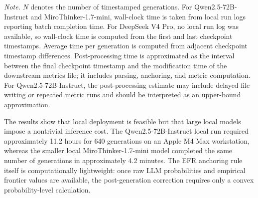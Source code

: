 \documentclass[11pt]{article}
\begin{document}
\begin{table}[htbp]
\centering
\caption{Runtime summary for full-scale unconstrained LLM generation.}
\label{tab:S10}

\vspace{0.3em}
\begin{minipage}{0.95\textwidth}
\small
\textit{Note.} \(N\) denotes the number of timestamped generations. For Qwen2.5-72B-Instruct and MiroThinker-1.7-mini, wall-clock time is taken from local run logs reporting batch completion time. For DeepSeek V4 Pro, no local run log was available, so wall-clock time is computed from the first and last checkpoint timestamps. Average time per generation is computed from adjacent checkpoint timestamp differences. Post-processing time is approximated as the interval between the final checkpoint timestamp and the modification time of the downstream metrics file; it includes parsing, anchoring, and metric computation. For Qwen2.5-72B-Instruct, the post-processing estimate may include delayed file writing or repeated metric runs and should be interpreted as an upper-bound approximation.
\end{minipage}
\end{table}

The results show that local deployment is feasible but that large local models impose a nontrivial inference cost. The Qwen2.5-72B-Instruct local run required approximately 11.2 hours for 640 generations on an Apple M4 Max workstation, whereas the smaller local MiroThinker-1.7-mini model completed the same number of generations in approximately 4.2 minutes. The EFR anchoring rule itself is computationally lightweight: once raw LLM probabilities and empirical frontier values are available, the post-generation correction requires only a convex probability-level calculation.
\end{document}
